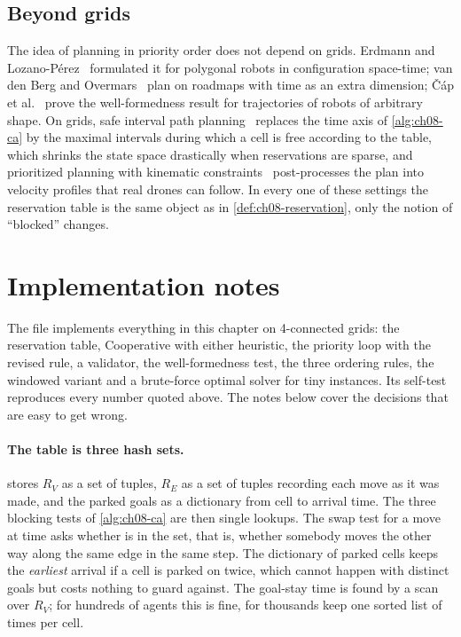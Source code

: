 \subsection{Beyond grids}
\label{sec:ch08-beyond}

The idea of planning in priority order does not depend on grids. Erdmann and
Lozano-P\'erez~\cite{erdmann1987multiple} formulated it for polygonal robots in
configuration space-time; van den Berg and Overmars~\cite{vandenberg2005prioritized}
plan on roadmaps with time as an extra dimension; \v{C}\'ap et
al.~\cite{cap2015prioritized} prove the well-formedness result for trajectories of
robots of arbitrary shape. On grids, safe interval path planning~\cite{phillips2011sipp}
replaces the time axis of \cref{alg:ch08-ca} by the maximal intervals during which a
cell is free according to the table, which shrinks the state space drastically when
reservations are sparse, and prioritized planning with kinematic
constraints~\cite{honig2016mapf} post-processes the plan into velocity profiles that
real drones can follow. In every one of these settings the reservation table is the
same object as in \cref{def:ch08-reservation}, only the notion of ``blocked'' changes.

\section{Implementation notes}
\label{sec:ch08-implementation}

The file  implements everything in this chapter on
4-connected grids: the reservation table, Cooperative \astar with either heuristic, the
priority loop with the revised rule, a validator, the well-formedness test, the three
ordering rules, the windowed variant and a brute-force optimal solver for tiny
instances. Its self-test reproduces every number quoted above. The notes below cover
the decisions that are easy to get wrong.

\paragraph{The table is three hash sets.}  stores $R_V$ as a set
of  tuples, $R_E$ as a set of  tuples recording each
move as it was made, and the parked goals as a dictionary from cell to arrival time.
The three blocking tests of \cref{alg:ch08-ca} are then single lookups. The swap test
for a move  at time  asks whether  is in the set,
that is, whether somebody moves the other way along the same edge in the same step.
The dictionary of parked cells keeps the \emph{earliest} arrival if a cell is parked on
twice, which cannot happen with distinct goals but costs nothing to guard against. The
goal-stay time is found by a scan over $R_V$; for hundreds of agents this is fine, for
thousands keep one sorted list of times per cell.

